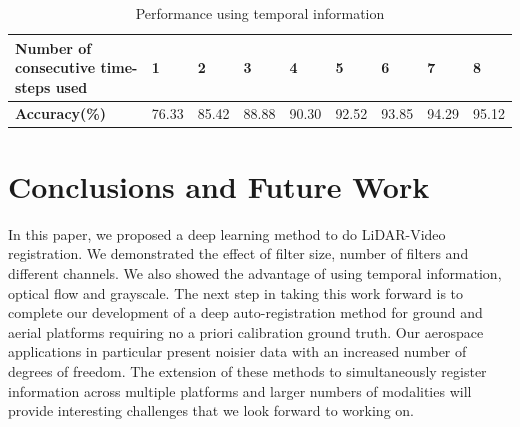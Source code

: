 \documentclass{article}
\begin{document}
\begin{table}[htbp]
\small
\caption{Performance using temporal information}
\begin{center}
     \begin{tabular}{ | p{4cm} | l | l | l | l | l | l | l | l |} \hline
     \textbf{Number of consecutive time-steps used} & \textbf{1} & \textbf{2} & \textbf{3} & \textbf{4} & \textbf{5} & \textbf{6} & \textbf{7} & \textbf{8} \\ \hline
     \textbf{Accuracy(\%)} & 76.33 & 85.42 & 88.88 & 90.30 & 92.52 & 93.85 & 94.29 & 95.12\\ \hline
     \end{tabular}
     \label{table:temporal_performance}
\end{center}
\end{table}



\section{Conclusions and Future Work} %
\label{sec:conclusions_and_future_work}
In this paper, we proposed a deep learning method to do LiDAR-Video registration. We demonstrated the effect of filter size, number of filters and different channels. We also showed the advantage of using temporal information, optical flow and grayscale.
The next step in taking this work forward is to complete our development of a deep auto-registration method for ground and aerial platforms requiring no a priori calibration ground truth.  Our aerospace applications in particular present noisier data with an increased number of degrees of freedom. The extension of these methods to simultaneously register information across multiple platforms and larger numbers of modalities will provide interesting challenges that we look forward to working on. 






\end{document}

